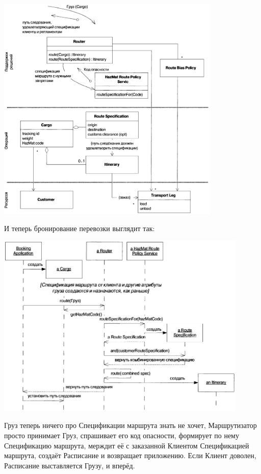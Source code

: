 \documentclass{../../text-style}
\begin{document}
\begin{center}
    \includegraphics[width=0.8\textwidth]{cargoHazMatOk.png}
\end{center}

И теперь бронирование перевозки выглядит так:

\begin{center}
    \includegraphics[width=0.9\textwidth]{cargoHazMatOkSequence.png}
\end{center}

Груз теперь ничего про Спецификации маршрута знать не хочет, Маршрутизатор просто принимает Груз, спрашивает его код опасности, формирует по нему Спецификацию маршрута, мерждит её с заказанной Клиентом Спецификацией маршрута, создаёт Расписание и возвращает приложению. Если Клиент доволен, Расписание выставляется Грузу, и вперёд.
\end{document}
